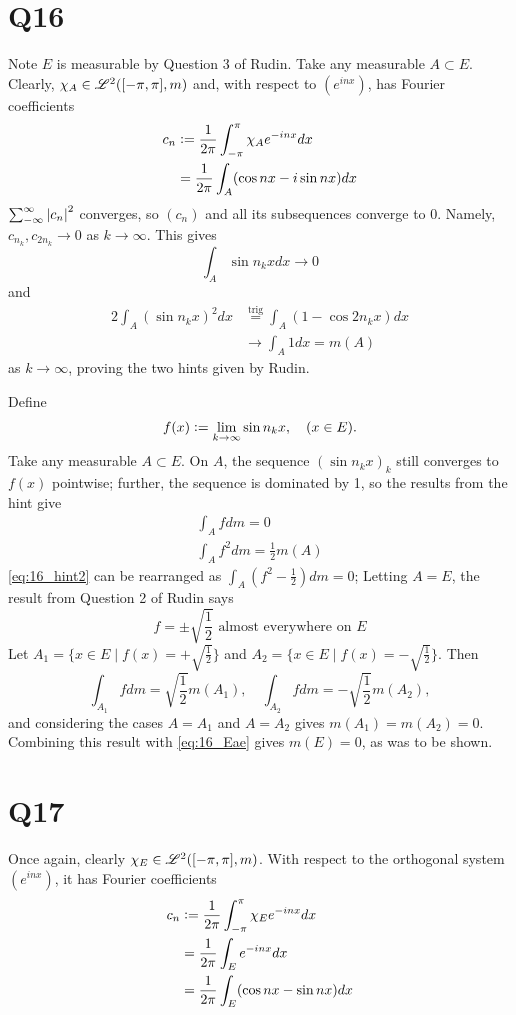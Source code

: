 \documentclass[12pt]{article}
\begin{document}
\section*{Q16} 
Note $E$ is measurable by Question 3 of Rudin. 
Take any measurable $A \subset E$. 
Clearly, $\chi_A \in \mathscr{L}^{2}([-\pi, \pi], m)$ and, with respect to $(e^{inx})$, has Fourier coefficients 
\begin{align*}
  c_n & \vcentcolon= \frac{1}{2\pi} \int_{-\pi}^{\pi} \chi_A e^{-inx} dx \\ 
	  & = \frac{1}{2\pi} \int_{A} (\cos{nx} - i\sin{nx}) dx 
\end{align*}
$\sum_{-\infty}^{\infty} \left|c_n\right|^{2}$ converges, so $(c_n)$ and all its subsequences converge to 0. 
Namely, $c_{n_k}, c_{2n_k} \rightarrow 0$ as $k \rightarrow \infty$. 
This gives 
$$\int_{A} \sin{n_k x} dx \rightarrow 0$$
and 
\begin{align*}
  2 \int_{A} (\sin{n_k x})^2 dx & \overset{\text{trig}}{=} \int_{A} (1 - \cos{2n_k x})dx \\ 
								  & \rightarrow \int_{A} 1 dx = m(A)
\end{align*}
as $k \rightarrow \infty$, proving the two hints given by Rudin. 

Define 
$$f(x) \vcentcolon= \lim_{k \rightarrow \infty} \sin{n_k x}, \quad (x \in E).$$
Take any measurable $A \subset E$. 
On $A$, the sequence $(\sin{n_k x})_k$ still converges to $f(x)$ pointwise; 
further, the sequence is dominated by 1, so the results from the hint give 
\begin{gather}
  \int_{A} f dm = 0 \label{eq:16_hint1} \\ 
  \int_{A} f^2 dm = \frac{1}{2}m(A) \label{eq:16_hint2} 
\end{gather}
\eqref{eq:16_hint2} can be rearranged as $\int_{A} (f^2 - \frac{1}{2}) dm = 0$; 
Letting $A = E$, the result from Question 2 of Rudin says 
\begin{equation} \label{eq:16_Eae} 
  f = \pm\sqrt{\frac{1}{2}} \text{ almost everywhere on } E
\end{equation}
Let $A_1 = \{x \in E \mid f(x) = +\sqrt{\frac{1}{2}}\}$ and $A_2 = \{x \in E \mid f(x) = -\sqrt{\frac{1}{2}}\}$. 
Then 
$$\int_{A_1} f dm = \sqrt{\frac{1}{2}} m(A_1), \quad \int_{A_2} f dm = -\sqrt{\frac{1}{2}} m(A_2),$$
and considering the cases $A = A_1$ and $A = A_2$ gives $m(A_1) = m(A_2) = 0$. 
Combining this result with \eqref{eq:16_Eae} gives $m(E) = 0$, as was to be shown. 

\section*{Q17} 
Once again, clearly $\chi_E \in \mathscr{L}^{2}([-\pi, \pi], m)$. 
With respect to the orthogonal system $(e^{inx})$, it has Fourier coefficients 
\begin{align*}
  c_n & \vcentcolon= \frac{1}{2\pi} \int_{-\pi}^{\pi} \chi_{E} e^{-inx} dx \\ 
	  & = \frac{1}{2\pi} \int_{E} e^{-inx}dx \\ 
	  & = \frac{1}{2\pi} \int_{E} (\cos{nx} - \sin{nx})dx
\end{align*}
\end{document}
